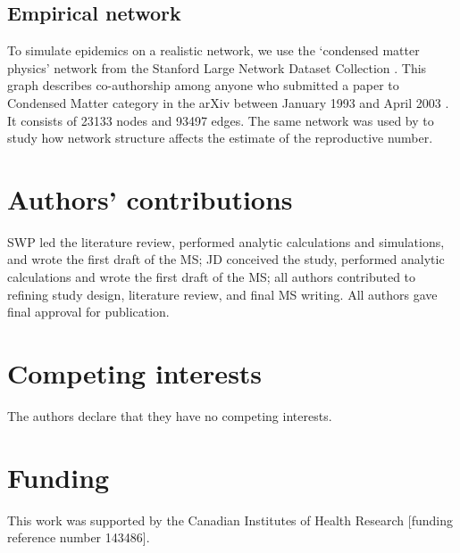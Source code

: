 \documentclass[12pt]{article}
\begin{document}
\subsection{Empirical network}

To simulate epidemics on a realistic network, we use the `condensed matter physics' network from the Stanford Large Network Dataset Collection \citep{leskovec2016snap}.
This graph describes co-authorship among anyone who submitted a paper to Condensed Matter category in the arXiv between January 1993 and April 2003 \citep{leskovec2007graph}.
It consists of 23133 nodes and 93497 edges.
The same network was used by \cite{trapman2016inferring} to study how network structure affects the estimate of the reproductive number.

\section*{Authors' contributions}

SWP led the literature review, performed analytic calculations and simulations, and wrote the first draft of the MS; JD conceived the study, performed analytic calculations and wrote the first draft of the MS; all authors contributed to refining study design, literature review, and final MS writing. All authors gave final approval for publication. 

\section*{Competing interests}

The authors declare that they have no competing interests.

\section*{Funding}

This work was supported by the Canadian Institutes of Health Research [funding reference number 143486].

\pagebreak


\end{document}
